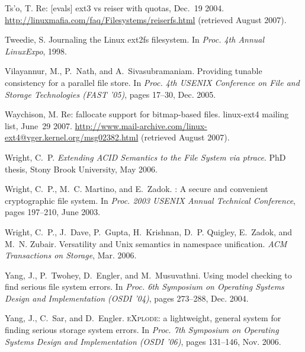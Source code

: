 \documentclass[9pt,twocolumn,letterpaper]{article}
\begin{document}
\begin{footnotesize}
\begin{thebibliography}{43}
Ts'o, T.
\newblock Re: [evals] ext3 vs reiser with quotas, Dec.~19 2004.
\newblock \url{http://linuxmafia.com/faq/Filesystems/reiserfs.html} (retrieved
  August 2007).

Tweedie, S.
\newblock Journaling the {L}inux {ext2fs} filesystem.
\newblock In \emph{Proc. 4th Annual LinuxExpo}, 1998.

Vilayannur, M., P.~Nath, and A.~Sivasubramaniam.
\newblock Providing tunable consistency for a parallel file store.
\newblock In \emph{Proc. 4th {USENIX} Conference on File and Storage
  Technologies ({FAST} '05)}, pages 17--30, Dec. 2005.

Waychison, M.
\newblock Re: fallocate support for bitmap-based files.
\newblock linux-ext4 mailing list, June~29 2007.
\newblock
  \url{http://www.mail-archive.com/linux-ext4@vger.kernel.org/msg02382.html}
  (retrieved August 2007).

Wright, C.~P.
\newblock \emph{Extending {ACID} Semantics to the File System via {ptrace}}.
\newblock PhD thesis, Stony Brook University, May 2006.

Wright, C.~P., M.~C. Martino, and E.~Zadok.
: A secure and convenient cryptographic file system.
\newblock In \emph{Proc. 2003 {USENIX} Annual Technical Conference}, pages
  197--210, June 2003.

Wright, C.~P., J.~Dave, P.~Gupta, H.~Krishnan, D.~P. Quigley, E.~Zadok, and
  M.~N. Zubair.
\newblock Versatility and {U}nix semantics in namespace unification.
\newblock \emph{{ACM} Transactions on Storage}, Mar. 2006.

Yang, J., P.~Twohey, D.~Engler, and M.~Musuvathni.
\newblock Using model checking to find serious file system errors.
\newblock In \emph{Proc. 6th Symposium on Operating Systems Design and
  Implementation ({OSDI} '04)}, pages 273--288, Dec. 2004.

Yang, J., C.~Sar, and D.~Engler.
\newblock \textsc{eXplode}: a lightweight, general system for finding serious
  storage system errors.
\newblock In \emph{Proc. 7th Symposium on Operating Systems Design and
  Implementation ({OSDI} '06)}, pages 131--146, Nov. 2006.


\end{thebibliography}
\end{footnotesize}
\end{document}
